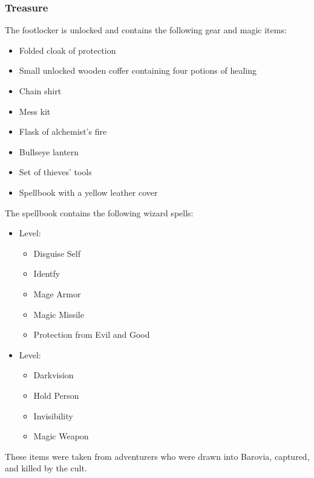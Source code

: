 \subsubsection*{Treasure}
\begin{readout}
  The footlocker is unlocked and contains the following gear and magic items:
  \begin{itemize}
    \item Folded cloak of protection
    \item Small unlocked wooden coffer containing four potions of healing
    \item Chain shirt
    \item Mess kit
    \item Flask of alchemist's fire
    \item Bullseye lantern
    \item Set of thieves' tools
    \item Spellbook with a yellow leather cover
  \end{itemize}
\end{readout}
The spellbook contains the following wizard spells:
\begin{itemize}
  \item {} Level:
  \begin{itemize}
    \item Disguise Self
    \item Identfy
    \item Mage Armor
    \item Magic Missile
    \item Protection from Evil and Good
  \end{itemize}
  \item {} Level:
  \begin{itemize}
    \item Darkvision
    \item Hold Person
    \item Invisibility
    \item Magic Weapon
  \end{itemize}
\end{itemize}
These items were taken from adventurers who were drawn into Barovia, captured, and killed by the cult.

\begin{arealinks}
\end{arealinks}


\pagebreak
